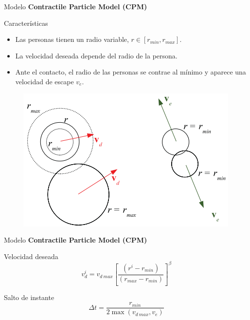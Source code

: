 \begin{frame}{Modelo}
    \textbf{\large{Contractile Particle Model (CPM)}}
    \begin{center}
        \begin{minipage}[c]{0.6\textwidth}
            \begin{block}{Características}
                \begin{itemize}
                    \item Las personas tienen un radio variable, $r \in [r_{min}, r_{max}]$.
                    \item La velocidad deseada depende del radio de la persona.
                    \item Ante el contacto, el radio de las personas se contrae al mínimo y aparece una velocidad de escape $v_e$.
                \end{itemize}
            \end{block}
        \end{minipage}
        \hfill
        \begin{minipage}[c]{0.3\textwidth}
            \begin{figure}
                \centering
                \includegraphics[width=\textwidth]{pic/01-introduccion/cpm}
                \label{fig:cpm}
            \end{figure}
        \end{minipage}
    \end{center}
\end{frame}

\begin{frame}{Modelo}
    \textbf{\large{Contractile Particle Model (CPM)}}
    \begin{block}{Velocidad deseada}
        \begin{equation*}
            v_d^i = v_{d\ max} \left[ \frac{(r^i - r_{min})}{(r_{max} - r_{min})} \right]^{\beta}
        \end{equation*}
    \end{block}
    \begin{block}{Salto de instante}
        \begin{equation*}
            \Delta t = \frac{r_{min}}{2 \max (v_{d\ max}, v_e)}
        \end{equation*}
    \end{block}
\end{frame}

